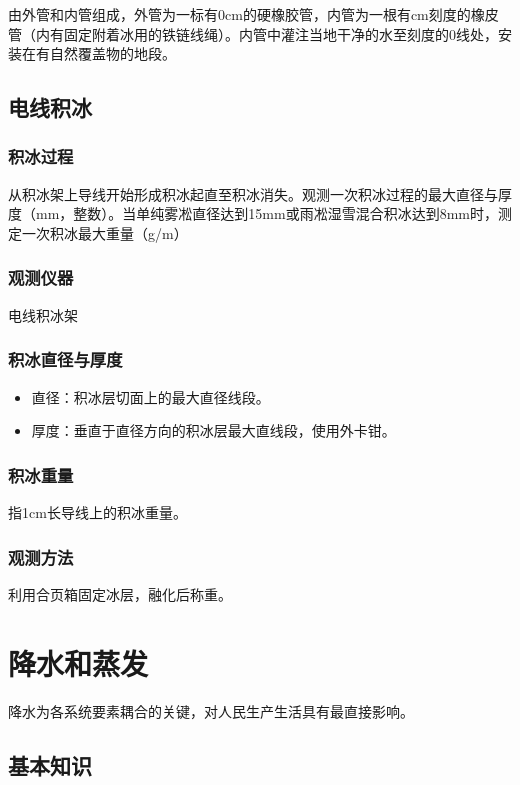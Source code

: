 \documentclass[UTF8,11pt]{ctexbook}
\begin{document}
由外管和内管组成，外管为一标有0cm的硬橡胶管，内管为一根有cm刻度的橡皮管（内有固定附着冰用的铁链线绳）。内管中灌注当地干净的水至刻度的0线处，安装在有自然覆盖物的地段。

\section{电线积冰}

\subsection{积冰过程}

从积冰架上导线开始形成积冰起直至积冰消失。观测一次积冰过程的最大直径与厚度（mm，整数）。当单纯雾凇直径达到15mm或雨凇湿雪混合积冰达到8mm时，测定一次积冰最大重量（g/m）

\subsection{观测仪器}

电线积冰架

\subsection{积冰直径与厚度}
\begin{itemize}
    \item 直径：积冰层切面上的最大直径线段。
    \item 厚度：垂直于直径方向的积冰层最大直线段，使用外卡钳。
\end{itemize}

\subsection{积冰重量}

指1cm长导线上的积冰重量。

\subsection{观测方法}

利用合页箱固定冰层，融化后称重。

\chapter{降水和蒸发}

降水为各系统要素耦合的关键，对人民生产生活具有最直接影响。

\section{基本知识}
\end{document}
